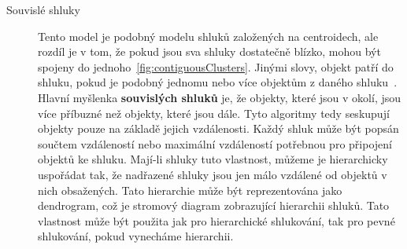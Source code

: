 \begin{description}
\item[Souvislé shluky] Tento model je podobný modelu shluků založených na centroidech, ale rozdíl je v tom, že pokud jsou sva shluky dostatečně blízko, mohou být spojeny do jednoho~\autoref{fig:contiguousClusters}. Jinými slovy, objekt patří do shluku, pokud je podobný jednomu nebo více objektům z daného shluku~\cite{Tan05}. \\
Hlavní myšlenka \textbf {souvislých shluků} je, že objekty, které jsou v okolí, jsou více příbuzné než objekty, které jsou dále. Tyto algoritmy tedy seskupují objekty pouze na základě jejich vzdálenosti. Každý shluk může být popsán součtem vzdáleností nebo maximální vzdáleností potřebnou pro připojení objektů ke shluku. Mají-li shluky tuto vlastnost, můžeme je hierarchicky uspořádat tak, že nadřazené shluky jsou jen málo vzdálené od objektů v nich obsažených. Tato hierarchie může být reprezentována jako dendrogram, což je stromový diagram zobrazující hierarchii shluků. Tato vlastnost může být použita jak pro hierarchické shlukování, tak pro pevné shlukování, pokud vynecháme hierarchii. \\


\end{description}
